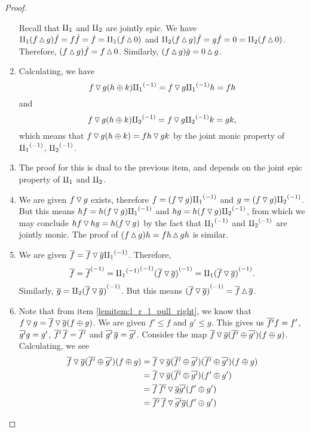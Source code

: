 \begin{proof}
\begin{enumerate}[{(}i{)}]
      Recall that $\amalg_{1}$ and $\amalg_{2}$ are jointly epic. We have
      $\amalg_{1}(f \operatorname{\vartriangle} g)\hat{f} = f\hat{f} = f = \amalg_{1}(f\operatorname{\vartriangle} 0) $ and
      $\amalg_{2}(f \operatorname{\vartriangle} g)\hat{f} = g\hat{f} = 0= \amalg_{2}(f\operatorname{\vartriangle} 0)$.
      Therefore, $(f \operatorname{\vartriangle} g)\hat{f} = f \operatorname{\vartriangle} 0$. Similarly,
      $(f \operatorname{\vartriangle} g) \hat{g} = 0 \operatorname{\vartriangle} g$.
    \item Calculating, we have
      \[
        f \operatorname{\triangledown} g (h \oplus k) {\amalg_{1}}^{(-1)} = f\operatorname{\triangledown} g {\amalg_{1}}^{(-1)} h = f h
      \]
      and
      \[
        f \operatorname{\triangledown} g (h \oplus k) {\amalg_{2}}^{(-1)} = f\operatorname{\triangledown} g {\amalg_{2}}^{(-1)} k = g k,
      \]
      which means that
      $f \operatorname{\triangledown} g (h \oplus k) = f h \operatorname{\triangledown} g k$ by the joint monic property of ${\amalg_{1}}^{(-1)}$, ${\amalg_{2}}^{(-1)}$.
    \item The proof for this is dual to the previous item, and depends on the joint epic property
      of $\amalg_{1}$ and $\amalg_{2}$.
    \item We are given $f\operatorname{\triangledown} g$ exists, therefore $f = (f\operatorname{\triangledown} g){\amalg_{1}}^{(-1)}$ and
      $g = (f\operatorname{\triangledown} g){\amalg_{2}}^{(-1)}$. But this means $hf = h(f\operatorname{\triangledown} g){\amalg_{1}}^{(-1)}$ and
      $h g = h(f\operatorname{\triangledown} g){\amalg_{2}}^{(-1)}$, from which we may conclude $hf \operatorname{\triangledown} h g = h(f\operatorname{\triangledown} g)$ by
      the fact that ${\amalg_{1}}^{(-1)}$ and ${\amalg_{2}}^{(-1)}$ are jointly monic. The proof of
      $(f\operatorname{\vartriangle} g)h = f h \operatorname{\vartriangle} g h$ is similar.
    \item We are given $\overline{f} = \overline{f}\operatorname{\triangledown}\overline{g} {\amalg_{1}}^{(-1)}$. Therefore,
      \[
        \overline{f} = {\overline{f}}^{(-1)} = {{\amalg_{1}}^{(-1)}}^{(-1)}{(\overline{f}\operatorname{\triangledown}\overline{g})}^{(-1)}
          = \amalg_{1} {(\overline{f}\operatorname{\triangledown}\overline{g})}^{(-1)}.
      \]
      Similarly, $\overline{g} = \amalg_{2} {(\overline{f}\operatorname{\triangledown}\overline{g})}^{(-1)}$. But this means
      ${(\overline{f}\operatorname{\triangledown}\overline{g})}^{(-1)} = \overline{f}\operatorname{\vartriangle}\overline{g}$.
    \item Note that from item \ref{lemitem:l_r_l_pull_right}, we know that
      $f \operatorname{\triangledown} g  = \overline{f} \operatorname{\triangledown} \overline{g} (f\oplus g)$. We are given $f' \le f$ and $g' \le g$. This
      gives us $\overline{f'}f =f'$, $\overline{g'}g =g'$, $\overline{f'}\,\overline{f} =\overline{f'}$ and
      $\overline{g'}\,\overline{g} =\overline{g'}$. Consider the map
      $\overline{f} \operatorname{\triangledown} \overline{g} (\overline{f'}\oplus\overline{g'})(f\oplus g)$. Calculating, we see
      \begin{align*}
        \rst{f} \tjdown \rst{g} (\rst{f'}\+\rst{g'})(f\+g)
          &= \rst{f} \tjdown \rst{g} (\rst{f'}\+\rst{g'})(\rst{f'}\+\rst{g'})(f\+g) \\
          & = \rst{f} \tjdown \rst{g} (\rst{f'}\+\rst{g'})(f'\+g') \\
          & = \rst{f}\,\rst{f'} \tjdown \rst{g} \rst{g'} (f'\+g') \\
          & = \rst{f'}\,\rst{f} \tjdown \rst{g'} \rst{g} (f'\+g') \\

\end{align*}
\end{enumerate}
\end{proof}
